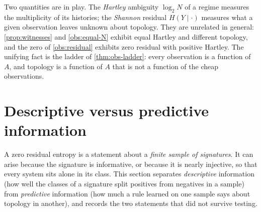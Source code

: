 Two quantities are in play. The \emph{Hartley} ambiguity $\log_2N$ of a regime measures the multiplicity of its histories; the \emph{Shannon} residual $H(Y\mid\cdot)$ measures what a given observation leaves unknown about topology. They are unrelated in general: \cref{prop:witnesses} and \cref{obs:equal-N} exhibit equal Hartley and different topology, and the zero of \cref{obs:residual} exhibits zero residual with positive Hartley. The unifying fact is the ladder of \cref{thm:obs-ladder}: every observation is a function of $A$, and topology is a function of $A$ that is not a function of the cheap observations.

\section{Descriptive versus predictive information}\label{sec:predictive}
A zero residual entropy is a statement about a \emph{finite sample of signatures}. It can arise because the signature is informative, or because it is nearly injective, so that every system sits alone in its class. This section separates \emph{descriptive} information (how well the classes of a signature split positives from negatives in a sample) from \emph{predictive} information (how much a rule learned on one sample says about topology in another), and records the two statements that did not survive testing.


